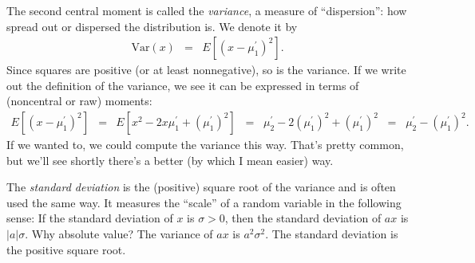 The second central moment is called the {\it variance\/},
a measure of ``dispersion'':  how spread out or dispersed the distribution is.
We denote it by
\begin{eqnarray*}
    \mbox{Var}(x)  &=&  E [(x-\mu_1^\prime)^2] .
\end{eqnarray*}
Since squares are positive (or at least nonnegative), so is the variance.
If we write out the definition of the variance,
we see it can be expressed in terms of (noncentral or raw) moments:
\begin{eqnarray*}
    E [(x-\mu_1^\prime)^2]  &=&  E [x^2 - 2 x\mu_1^\prime + (\mu_1^\prime)^2]
            \;\;=\;\; \mu_2^\prime - 2 (\mu_1^\prime)^2 + (\mu_1^\prime)^2
            \;\;=\;\; \mu_2^\prime -  (\mu_1^\prime)^2 .
\end{eqnarray*}
If we wanted to, we could compute the variance this way.
That's pretty common, but we'll see shortly there's a
better (by which I mean easier) way.

The {\it standard deviation\/} is the (positive) square root of the variance
and is often used the same way.
It measures the ``scale'' of a random variable
in the following sense:
If the standard deviation of $x$ is $\sigma>0$,
then the standard deviation of $ax$ is $| a | \sigma$.
Why absolute value?  The variance of $ax$ is $a^2 \sigma^2$.
The standard deviation is the positive square root.

